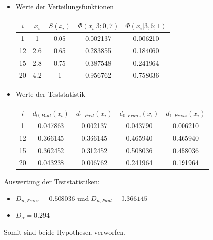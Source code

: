 \documentclass{beamer}
\begin{document}
\begin{frame}{\insertsubsection}
\begin{example}
	\begin{itemize}
		\item Werte der Verteilungsfunktionen
			\begin{table}[ht]
			\center
			\begin{tabular}{c|c|c|c|c}
			$i$ 	& $x_i$ 	& $S(x_i)$ 	& $\Phi (x_i|3;0,7)$ 	& $\Phi (x_i|3,5;1)$ 	\\
			\hline
			1	&	1	&	0.05	&	0.002137	&	0.006210	\\
			12	&	2.6	&	0.65	&	0.283855	&	0.184060	\\
			15	&	2.8	&	0.75	&	0.387548	&	0.241964	\\
			20	&	4.2	&	1	&	0.956762	&	0.758036	\\
			\end{tabular}
			\end{table}
		\item Werte der Teststatistik
			\begin{table}[ht]
			\center
			\begin{tabular}{c|c|c|c|c}
			$i$ 	& $d_{0,Paul}(x_i)$ 	& $d_{1,Paul}(x_i)$ 	& $d_{0,Franz}(x_i)$ 	& $d_{1,Franz}(x_i)$ 	\\
			\hline
			1	&	0.047863	&	0.002137	&	0.043790	&	0.006210	\\
			12	&	0.366145	&	0.366145	&	0.465940	&	0.465940	\\
			15	&	0.362452	&	0.312452	&	0.508036	&	0.458036	\\
			20	&	0.043238	&	0.006762	&	0.241964	&	0.191964	\\
			\end{tabular}
			\end{table}
	\end{itemize}
\end{example}
\end{frame}

\begin{frame}{\insertsubsection}
\begin{example}
Auswertung der Teststatistiken:
	\begin{itemize}
		\item $D_{n,Franz}=0.508036$ und $D_{n,Paul}=0.366145$
		\item $D_\alpha=0.294$
	\end{itemize}
Somit sind beide Hypothesen verworfen.
\end{example}
\end{frame}
\end{document}
